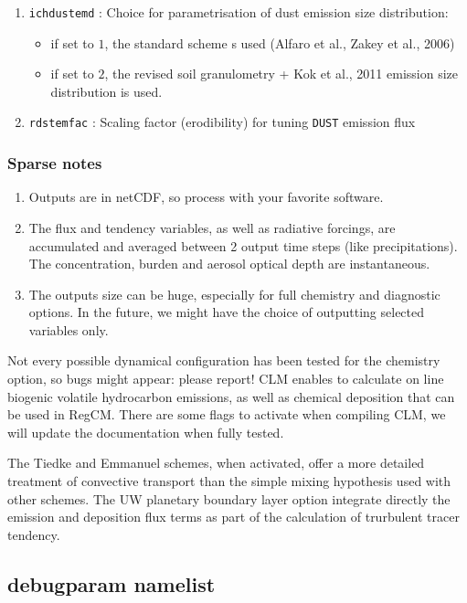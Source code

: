 \begin{enumerate}
\begin{itemize}
    \end{itemize}
  \item \verb=ichdustemd= : Choice for parametrisation of dust emission size
    distribution:
    \begin{itemize}
      \item if set to $1$, the standard scheme s used (Alfaro et al.,
        Zakey et al., 2006)
      \item if set to $2$, the revised soil granulometry + Kok et al., 2011
        emission size distribution is used.
    \end{itemize}
  \item \verb=rdstemfac= : Scaling factor (erodibility) for tuning  \verb=DUST= emission flux
\end{enumerate}

\subsubsection{Sparse notes}

\begin{enumerate}
  \item Outputs are in netCDF, so process with your favorite software.
  \item The flux and tendency variables, as well as radiative forcings,
    are accumulated and averaged between 2 output time steps (like
    precipitations). The concentration, burden and aerosol optical depth
    are instantaneous.
  \item The outputs size can be huge, especially for full chemistry and
    diagnostic options. In the future, we might have the choice of outputting
    selected variables only.
\end{enumerate}

Not every possible dynamical configuration has been tested for the chemistry
option, so bugs might appear: please report!
CLM enables to calculate on line biogenic volatile hydrocarbon emissions, as
well as chemical deposition that can be used in RegCM. There are some flags to
activate when compiling CLM, we will update the documentation when fully tested.

The Tiedke and Emmanuel schemes, when activated, offer a more detailed
treatment of convective transport than the simple mixing hypothesis used with
other schemes.
The UW planetary boundary layer option integrate directly the emission and
deposition flux terms as part of the calculation of trurbulent tracer tendency.

\subsection{debugparam namelist}

